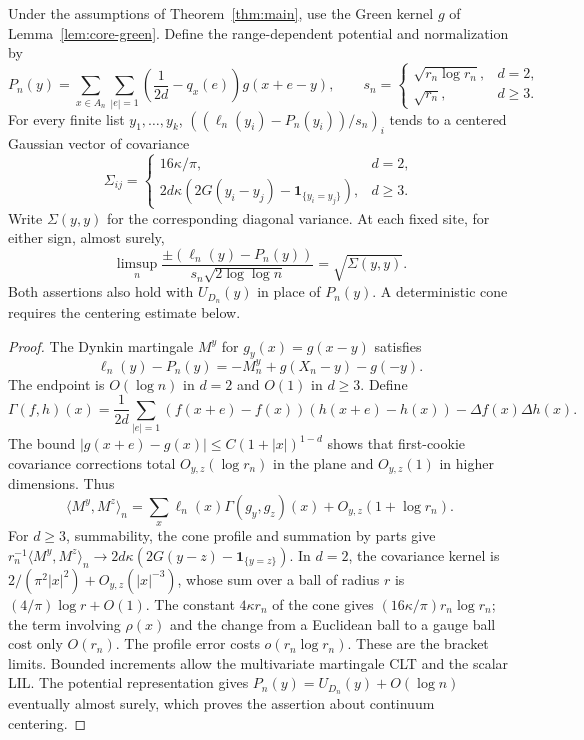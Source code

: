 \begin{theorem}
\label{thm:general-local-clt}
Under the assumptions of Theorem~\ref{thm:main}, use the Green
kernel $g$ of Lemma~\ref{lem:core-green}.
Define the range-dependent potential and normalization by
\[
 P_n(y)=\sum_{x\in A_n}\sum_{|e|=1}
       \left(\frac1{2d}-q_x(e)\right)g(x+e-y),\qquad
 s_n=\begin{cases}\sqrt{r_n\log r_n},&d=2,\\
                         \sqrt{r_n},&d\geq3.
             \end{cases}
\]
For every finite list $y_1,\ldots,y_k$,
$((\ell_n(y_i)-P_n(y_i))/s_n)_i$ tends to a centered Gaussian
vector of covariance
\[
 \Sigma_{ij}=\begin{cases}16\kappa/\pi,&d=2,\\
 2d\kappa(2G(y_i-y_j)-\mathbf1_{\{y_i=y_j\}}),&d\geq3.
 \end{cases}
\]
Write $\Sigma(y,y)$ for the corresponding diagonal variance.
At each fixed site, for either sign, almost surely,
\[
 \limsup_n\frac{\pm(\ell_n(y)-P_n(y))}
                   {s_n\sqrt{2\log\log n}}=\sqrt{\Sigma(y,y)}.
\]
Both assertions also hold with $U_{D_n}(y)$ in place of $P_n(y)$.
A deterministic cone requires the centering estimate below.
\end{theorem}
\begin{proof}
The Dynkin martingale $M^y$ for $g_y(x)=g(x-y)$ satisfies
\[
 \ell_n(y)-P_n(y)=-M_n^y+g(X_n-y)-g(-y).
\]
The endpoint is $O(\log n)$ in $d=2$ and $O(1)$ in $d\geq3$.
Define
\[
 \Gamma(f,h)(x)=\frac1{2d}\sum_{|e|=1}
 (f(x+e)-f(x))(h(x+e)-h(x))-\Delta f(x)\Delta h(x).
\]
The bound $|g(x+e)-g(x)|\leq C(1+|x|)^{1-d}$ shows that
first-cookie covariance corrections total $O_{y,z}(\log r_n)$
in the plane and $O_{y,z}(1)$ in higher dimensions. Thus
\[
 \langle M^y,M^z\rangle_n
       =\sum_x\ell_n(x)\Gamma(g_y,g_z)(x)+O_{y,z}(1+\log r_n).
\]
For $d\geq3$, summability, the cone profile and summation by parts
give $r_n^{-1}\langle M^y,M^z\rangle_n\to
2d\kappa(2G(y-z)-\mathbf1_{\{y=z\}})$.
In $d=2$, the covariance kernel is
$2/(\pi^2|x|^2)+O_{y,z}(|x|^{-3})$, whose sum over a ball of
radius $r$ is $(4/\pi)\log r+O(1)$.
The constant $4\kappa r_n$ of the cone gives
$(16\kappa/\pi)r_n\log r_n$; the term involving $\rho(x)$ and
the change from a Euclidean ball to a gauge ball cost only $O(r_n)$.
The profile error costs $o(r_n\log r_n)$. These are the bracket
limits. Bounded increments allow the multivariate martingale CLT
and the scalar LIL. The potential representation gives
$P_n(y)=U_{D_n}(y)+O(\log n)$ eventually almost surely,
which proves the assertion about continuum centering.
\end{proof}

